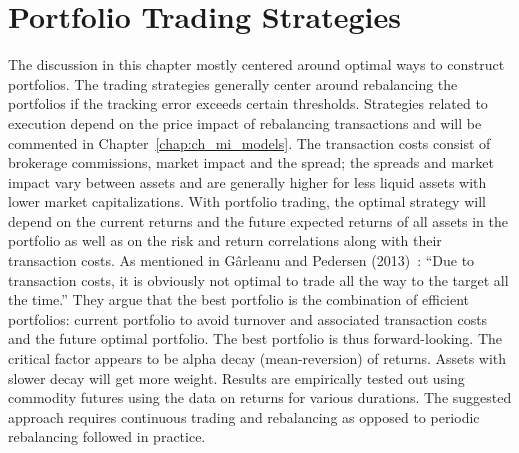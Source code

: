 \section{Portfolio Trading Strategies \label{sec:port_trad_strat}}


The discussion in this chapter mostly centered around optimal ways to construct portfolios. The trading strategies generally center around rebalancing the portfolios if the tracking error exceeds certain thresholds. Strategies related to execution depend on the price impact of rebalancing transactions and will be commented in Chapter~\ref{chap:ch_mi_models}. The transaction costs consist of brokerage commissions, market impact and the spread; the spreads and market impact vary between assets and are generally higher for less liquid assets with lower market capitalizations. With portfolio trading, the optimal strategy will depend on the current returns and the future expected returns of all assets in the portfolio as well as on the risk and return correlations along with their transaction costs. As mentioned in G\^{a}rleanu and Pedersen (2013)~\cite{garlepede}: ``Due to transaction costs, it is obviously not optimal to trade all the way to the target all the time.'' They argue that the best portfolio is the combination of efficient portfolios: current portfolio to avoid turnover and associated transaction costs and the future optimal portfolio. The best portfolio is thus forward-looking. The critical factor appears to be alpha decay (mean-reversion) of returns. Assets with slower decay will get more weight. Results are empirically tested out using commodity futures using the data on returns for various durations. The suggested approach requires continuous trading and rebalancing as opposed to periodic rebalancing followed in practice. 


